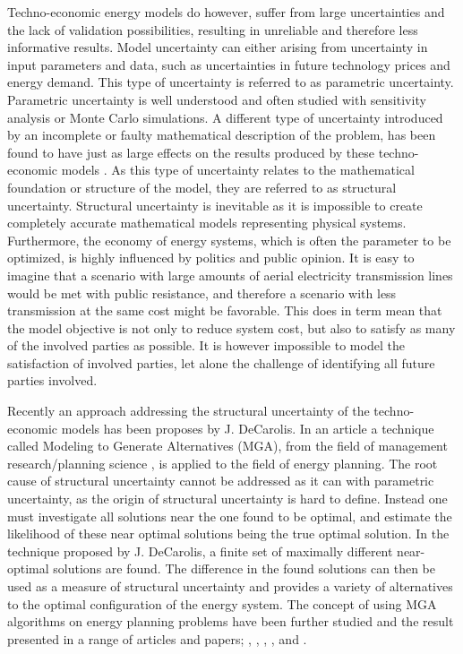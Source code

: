 Techno-economic energy models do however, suffer from large uncertainties and the lack of validation possibilities, resulting in unreliable and therefore less informative results.
Model uncertainty can either arising from uncertainty in input parameters and data, such as uncertainties in future technology prices and energy demand. This type of uncertainty is referred to as parametric uncertainty. Parametric uncertainty is well understood and often studied with sensitivity analysis or Monte Carlo simulations. 
A different type of uncertainty introduced by an incomplete or faulty mathematical description of the problem, has been found to have just as large effects on the results produced by these techno-economic models \cite{DeCarolis_MGA}. As this type of uncertainty relates to the mathematical foundation or structure of the model, they are referred to as structural uncertainty. 
Structural uncertainty is inevitable as it is impossible to create completely accurate mathematical models representing physical systems. Furthermore, the economy of energy systems, which is often the parameter to be optimized, is highly influenced by politics and public opinion. It is easy to imagine that a scenario with large amounts of aerial electricity transmission lines would be met with public resistance, and therefore a scenario with less transmission at the same cost might be favorable. 
This does in term mean that the model objective is not only to reduce system cost, but also to satisfy as many of the involved parties as possible. It is however impossible to model the satisfaction of involved parties, let alone the challenge of identifying all future parties involved.  


Recently an approach addressing the structural uncertainty of the techno-economic models has been proposes by J. DeCarolis. In an article \cite{DeCarolis_MGA} a technique called Modeling to Generate Alternatives (MGA), from the field of management research/planning science \cite{Brill_MGA_1982}, is applied to the field of energy planning. The root cause of structural uncertainty cannot be addressed as it can with parametric uncertainty, as the origin of structural uncertainty is hard to define. Instead one must investigate all solutions near the one found to be optimal, and estimate the likelihood of these near optimal solutions being the true optimal solution. In the technique proposed by J. DeCarolis, a finite set of maximally different near-optimal solutions are found. The difference in the found solutions can then be used as a measure of structural uncertainty and provides a variety of alternatives to the optimal configuration of the energy system. The concept of using MGA algorithms on energy planning problems have been further studied and the result presented in a range of articles and papers; \cite{DECAROLIS2016}, \cite{MGA_Price}, \cite{BERNTSEN2017886}, \cite{Yavuz2011}, \cite{Optimum_not_enough} and \cite{Fabian_MGA}.

